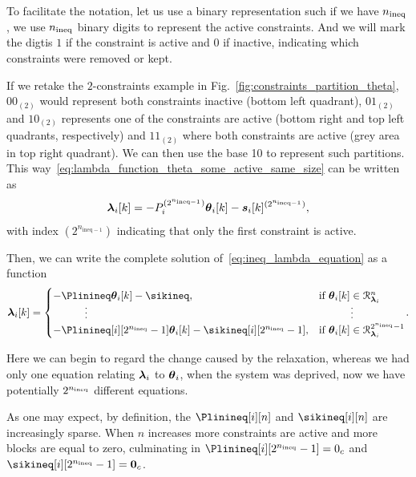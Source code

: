 \documentclass[../main.tex]{subfiles}
\begin{document}
To facilitate the notation, let us use a binary representation such if we have $n_{\text{ineq}}$, we use $n_{\text{ineq}}$ binary digits to represent the active constraints.
And we will mark the digtis $1$ if the constraint is active and $0$ if inactive, indicating which constraints were removed or kept.

If we retake the $2$-constraints example in Fig.~\ref{fig:constraints_partition_theta}, ${00}_{(2)}$ would represent both constraints inactive (bottom left quadrant), ${01}_{(2)}$ and ${10}_{(2)}$ represents one of the constraints are active (bottom right and top left quadrants, respectively) and ${11}_{(2)}$ where both constraints are active (grey area in top right quadrant).
We can then use the base 10 to represent such partitions.
This way~\eqref{eq:lambda_function_theta_some_active_same_size} can be written as
\begin{equation}
  \label{eq:lambda_function_theta_same_size_coded}
  \lambdaik=-\Plin^{(2^{n_{\text{ineq}-1}})}\thetaik-\sik^{(2^{n_{\text{ineq}-1}})},
\end{equation}
with index $(2^{n_{\text{ineq}-1}})$ indicating that only the first constraint is active.

Then, we can write the complete solution of~\eqref{eq:ineq_lambda_equation} as
a \pwa{} function
\begin{equation}
  \label{eq:lambdafuntheta}
  \begin{aligned}
    \lambdaik=
    \begin{cases}
      -\Plinineq\thetaik-\sikineq,&\text{if}\ \thetaik \in\set{R}_{\lambdai}^{n}\\
      \qquad\quad \vdots&\qquad\quad \vdots\\
      -\Plinineq[i][2^{\nineq}-1]\thetaik-\sikineq[i][2^{\nineq}-1],&\text{if}\ \thetaik \in\set{R}_{\lambdai}^{2^{\nineq}-1}\\
    \end{cases}
  \end{aligned}.
\end{equation}

Here we can begin to regard the change caused by the relaxation, whereas we had only one equation relating $\boldsymbol{\lambda}_{i}$ to $\boldsymbol{\theta}_{i}$, when the system was deprived, now we have potentially $2^{n_{\text{ineq}}}$ different equations.

\begin{remark}\label{rem:sparse_solutions}
  As one may expect, by definition, the $\Plinineq[i][n]$ and $\sikineq[i][n]$ are increasingly sparse.
  When $n$ increases more constraints are active and more blocks are equal to zero, culminating in $\Plinineq[i][2^{\nineq}-1]=0_{c}$ and $\sikineq[i][2^{\nineq}-1]=\0_{c}$.
\end{remark}
\end{document}
